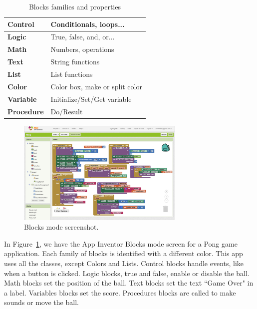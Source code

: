 \documentclass[a4paper]{article}
\begin{document}
\begin{table}
\begin{center}
\caption{Blocks families and properties}
\bigskip
\label{tab:block-fam}
\begin{tabular}{|l|l|}
\hline
\textbf{Control} & Conditionals, loops... \\ \hline
\textbf{Logic} & True, false, and, or... \\ \hline
\textbf{Math} & Numbers, operations\\ \hline
\textbf{Text} & String functions\\ \hline
\textbf{List} & List functions\\ \hline
\textbf{Color} & Color box, make or split color \\ \hline
\textbf{Variable} & Initialize/Set/Get variable\\ \hline
\textbf{Procedure} & Do/Result\\ \hline
\end{tabular}
\end{center}
\end{table}

\begin{figure}
\begin{center}
\includegraphics[height=5cm]{blocks-example}
\caption{Blocks mode screenshot.}
\label{fig:blocks-example}
\end{center}
\end{figure}

In Figure~\ref{fig:blocks-example}, we have the App Inventor Blocks mode screen for a Pong game application. Each family of blocks is identified with a different color. This app uses all the classes, except Colors and Lists. Control blocks handle events, like when a button is clicked. Logic blocks, true and false, enable or disable the ball. Math blocks set the position of the ball. Text blocks set the text ``Game Over" in a label. Variables blocks set the score. Procedures blocks are called to make sounds or move the ball.
\end{document}
